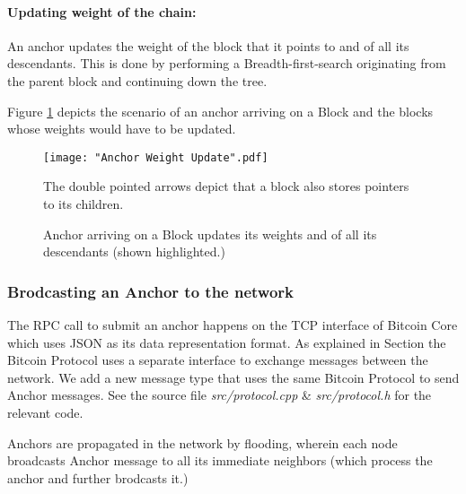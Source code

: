 \newpage
\paragraph{Updating weight of the chain:} 

An anchor updates the weight of the block that it points to and of all its descendants.
This is done by performing a Breadth-first-search originating from the parent block and continuing down the tree.

Figure \ref{fig-impl-anchor-weight-update} depicts the scenario of an anchor arriving on a Block and the blocks whose weights would have to be updated.

\setlength{\emergencystretch}{10pt}

\begin{figure}[!htb]
    \centering
    \texttt{[image: "Anchor Weight Update".pdf]}
    \caption[Weight update due to an Anchor]
    {Anchor arriving on a Block updates its weights and of all its descendants (shown highlighted.)}
    
    \medskip
    \footnotesize
    The double pointed arrows depict that a block also stores pointers to its children. 
    \label{fig-impl-anchor-weight-update}
\end{figure}


\subsubsection{Brodcasting an Anchor to the network}

The RPC call to submit an anchor happens on the TCP interface of Bitcoin Core which uses JSON as its data representation format. As explained in Section  the Bitcoin Protocol uses a separate interface to exchange messages between the network. 
We add a new message type that uses the same Bitcoin Protocol to send Anchor messages. 
See the source file \textit{src/protocol.cpp} \& \textit{src/protocol.h} for the relevant code.

Anchors are propagated in the network by flooding, wherein each node broadcasts Anchor message to all its immediate neighbors (which process the anchor and further brodcasts it.)


